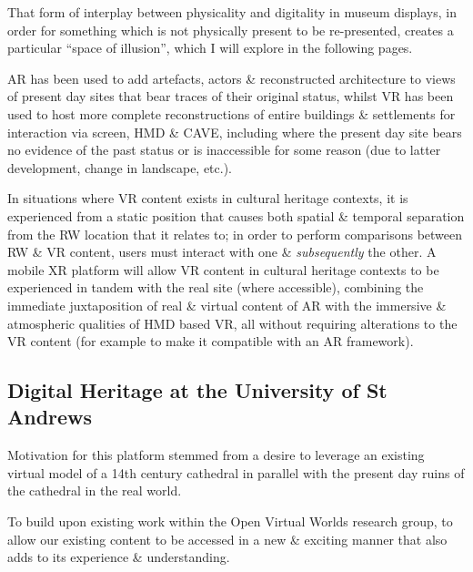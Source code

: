 That form of interplay between physicality and digitality in museum displays, in order for something which is not physically present to be re-presented, creates a particular ``space of illusion'', which I will explore in the following pages.


AR has been used to add artefacts, actors \& reconstructed architecture to views of present day sites that bear traces of their original status, whilst VR has been used to host more complete reconstructions of entire buildings \& settlements for interaction via screen, HMD \& CAVE, including where the present day site bears no evidence of the past status or is inaccessible for some reason (due to latter development, change in landscape, etc.).

In situations where VR content exists in cultural heritage contexts, it is experienced from a static position that causes both spatial \& temporal separation from the RW location that it relates to; in order to perform comparisons between RW \& VR content, users must interact with one \& \textit{subsequently} the other. A mobile XR platform will allow VR content in cultural heritage contexts to be experienced in tandem with the real site (where accessible), combining the immediate juxtaposition of real \& virtual content of AR with the immersive \& atmospheric qualities of HMD based VR, all without requiring alterations to the VR content (for example to make it compatible with an AR framework).



\subsection{Digital Heritage at the University of St Andrews}

Motivation for this platform stemmed from a desire to leverage an existing virtual model of a 14th century cathedral in parallel with the present day ruins of the cathedral in the real world.

To build upon existing work within the Open Virtual Worlds research group, to allow our existing content to be accessed in a new \& exciting manner that also adds to its experience \& understanding.



